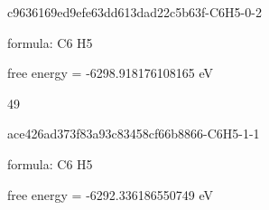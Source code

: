 \documentclass{article}
\begin{document}
\vspace{1cm}


c9636169ed9efe63dd613dad22c5b63f-C6H5-0-2



formula: C6 H5



free energy = -6298.918176108165 eV

49

\vspace{1cm}


ace426ad373f83a93c83458cf66b8866-C6H5-1-1



formula: C6 H5



free energy = -6292.336186550749 eV
\end{document}
